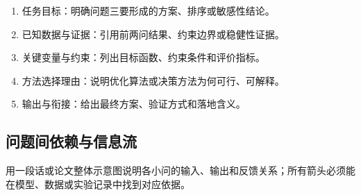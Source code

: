 \begin{enumerate}
  \item 任务目标：明确问题三要形成的方案、排序或敏感性结论。
  \item 已知数据与证据：引用前两问结果、约束边界或稳健性证据。
  \item 关键变量与约束：列出目标函数、约束条件和评价指标。
  \item 方法选择理由：说明优化算法或决策方法为何可行、可解释。
  \item 输出与衔接：给出最终方案、验证方式和落地含义。
\end{enumerate}

\subsection{问题间依赖与信息流}

用一段话或论文整体示意图说明各小问的输入、输出和反馈关系；所有箭头必须能在模型、数据或实验记录中找到对应依据。
